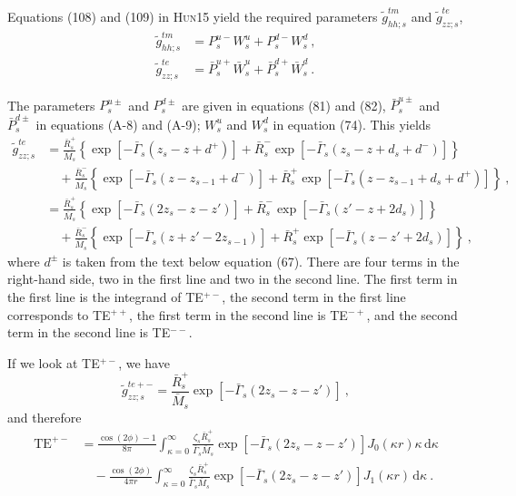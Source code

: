 \documentclass[fontsize=9pt, parskip=half, notitlepage, fleqn]{scrartcl}
\newcommand{\hun}{\textsc{Hun15}\xspace}
\newcommand{\mr}[1]{\mathrm{#1}}
\begin{document}
Equations (108) and (109) in \hun yield the required parameters
$\tilde{g}^{tm}_{hh;s}$ and $\tilde{g}^{te}_{zz;s}$,
%
\begin{align}
  \tilde{g}^{tm}_{hh;s}& = P^{u-}_s W^u_s + P^{d-}_s W^d_s \ , \\
  \tilde{g}^{te}_{zz;s}& = \bar{P}^{u+}_s \bar{W}^u_s +
                           \bar{P}^{d+}_s \bar{W}^d_s \ .
\end{align}
%

The parameters $P^{u\pm}_s$ and $P^{d\pm}_s$ are given in equations (81) and
(82), $\bar{P}^{u\pm}_s$ and $\bar{P}^{d\pm}_s$ in equations (A-8) and (A-9);
$W^u_s$ and $W^d_s$ in equation (74). This yields
%
\begin{align}
  \tilde{g}^{te}_{zz;s} &=
  \frac{\bar{R}_s^+}{\bar{M}_s}\left\{\exp[-\bar{\Gamma}_s(z_s-z+d^+)] +
    \bar{R}_s^-\exp[-\bar{\Gamma}_s(z_s-z+d_s+d^-)]\right\} \nonumber \\
  &\quad +
    \frac{\bar{R}_s^-}{\bar{M}_s}\left\{\exp[-\bar{\Gamma}_s(z-z_{s-1}+d^-)]+
    \bar{R}_s^+\exp[-\bar{\Gamma}_s(z-z_{s-1}+d_s+d^+)]\right\}\nonumber \ ,\\
  &=\frac{\bar{R}_s^+}{\bar{M}_s}\left\{\exp[-\bar{\Gamma}_s(2z_s-z-z')] +
    \bar{R}_s^-\exp[-\bar{\Gamma}_s(z'-z+2d_s)]\right\} \nonumber \\
  &\quad +
  \frac{\bar{R}_s^-}{\bar{M}_s}\left\{\exp[-\bar{\Gamma}_s(z+z'-2z_{s-1})]+
  \bar{R}_s^+\exp[-\bar{\Gamma}_s(z-z'+2d_s)]\right\}\ ,
\end{align}
%
where $d^\pm$ is taken from the text below equation (67). There are four terms
in the right-hand side, two in the first line and two in the second line. The
first term in the first line is the integrand of TE$^{+-}$, the second term in
the first line corresponds to TE$^{++}$, the first term in the second line is
TE$^{-+}$, and the second term in the second line is TE$^{--}$.

If we look at TE$^{+-}$, we have
%
\begin{equation}
  \tilde{g}^{te+-}_{zz;s} =
  \frac{\bar{R}_s^+}{\bar{M}_s}\exp[-\bar{\Gamma}_s(2z_s-z-z')] \ ,
\end{equation}
%
and therefore
%
\begin{align}
  \mr{TE}^{+-}& = \frac{\cos(2\phi)-1}{8\pi}\int^\infty_{\kappa=0}
  \frac{\zeta_s \bar{R}_s^+}{\bar{\Gamma}_s\bar{M}_s}
  \exp[-\bar{\Gamma}_s(2z_s-z-z')]
  J_0(\kappa r)\kappa\,\mr{d}\kappa \nonumber \\
  &\quad - \frac{\cos(2\phi)}{4\pi r}\int^\infty_{\kappa=0}
  \frac{\zeta_s \bar{R}_s^+}{\bar{\Gamma}_s\bar{M}_s}
  \exp[-\bar{\Gamma}_s(2z_s-z-z')]
  J_1(\kappa r)\,\mr{d}\kappa \ .
  \label{eq:hunte}
\end{align}
%
\end{document}
